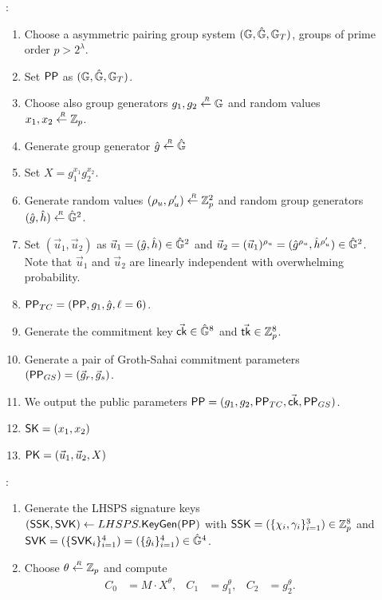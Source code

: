 \begin{description}
\item[]:
  \begin{enumerate}
  \item Choose a asymmetric pairing group system $(\mathbb{G}, \hat{\mathbb{G}}, \mathbb{G}_T)$, groups of prime order $p > 2^\lambda$.
  \item Set $\mathsf{PP}$ as $(\mathbb{G}, \hat{\mathbb{G}}, \mathbb{G}_T)$.
  \item Choose also group generators $g_1, g_2 \stackrel{{\scriptscriptstyle \mkern4mu R}}{\gets} \mathbb{G}$ and random values $x_1, x_2 \stackrel{{\scriptscriptstyle \mkern4mu R}}{\gets} \mathbb{Z}_p$.
  \item Generate group generator $\hat{g} \stackrel{{\scriptscriptstyle \mkern4mu R}}{\gets} \hat{\mathbb{G}}$
  \item Set $X = g_1^{x_1}g_2^{x_2}$.
  \item Generate random values $(\rho_u, \rho_u') \stackrel{{\scriptscriptstyle \mkern4mu R}}{\gets} \mathbb{Z}_p^2$ and random group generators $(\hat{g}, \hat{h}) \stackrel{{\scriptscriptstyle \mkern4mu R}}{\gets} \hat{\mathbb{G}}^2$.
  \item Set $(\vec{u}_1, \vec{u}_2)$ as $\vec{u}_1 = (\hat{g}, \hat{h}) \in \hat{\mathbb{G}}^2$ and $\vec{u}_2 = (\vec{u}_1)^{\rho_u} = (\hat{g}^{\rho_u}, \hat{h}^{\rho_u'}) \in \hat{\mathbb{G}}^2$. Note that $\vec{u}_1$ and $\vec{u}_2$ are linearly independent with overwhelming probability.
  \item $\mathsf{PP}_{TC} = (\mathsf{PP}, g_1, \hat{g}, \ell = 6)$.
  \item Generate the commitment key $\vec{\mathsf{ck}} \in \hat{\mathbb{G}}^8$ and $\vec{\mathsf{tk}} \in \mathbb{Z}_p^8$.
  \item Generate a pair of Groth-Sahai commitment parameters$(\mathsf{PP}_{GS}) = (\vec{g}_r, \vec{g}_s)$.
  \item We output the public parameters $\mathsf{PP} =  (g_1, g_2, \mathsf{PP}_{TC}, \vec{\mathsf{ck}}, \mathsf{PP}_{GS})$.
  \item $\mathsf{SK} = (x_1, x_2)$
  \item $\mathsf{PK} = (\vec{u}_1, \vec{u}_2, X)$
  \end{enumerate}
\item[]:
  \begin{enumerate}
  \item Generate the LHSPS signature keys $(\mathsf{SSK}, \mathsf{SVK}) \gets LHSPS.{\mathsf{KeyGen}}(\mathsf{PP})$ with $\mathsf{SSK} = (\{\chi_i, \gamma_i\}_{i=1}^3) \in \mathbb{Z}_p^{8}$ and $\mathsf{SVK} = (\{\mathsf{SVK}_i\}_{i=1}^4) = (\{\hat{g}_i\}_{i =1}^4) \in \hat{\mathbb{G}}^4$.
  \item Choose $\theta \stackrel{{\scriptscriptstyle \mkern4mu R}}{\gets} \mathbb{Z}_p$ and compute
    \begin{align*}
      C_0 &= M\cdot X^{\theta}, & C_1 &= g_1^{\theta}, & C_2 &= g_2^{\theta}.

\end{align*}
\end{enumerate}
\end{description}
